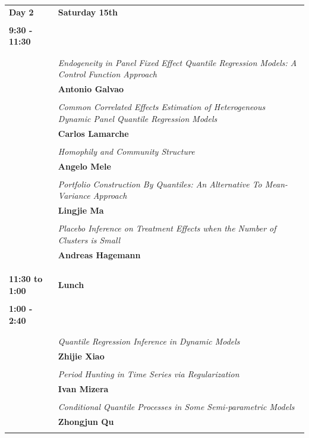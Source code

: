 \documentclass[11pt]{amsart}
\begin{document}
\begin{tabularx}{\linewidth}{l X}
\\
\large{\bf{Day 2}} & \large{\bf{Saturday 15th}} \\
\\


\bf{9:30 - 11:30} & \large{\color{blue}{\bf{Session 3}}}  \\
\hline
\\
\\
& \it{Endogeneity in Panel Fixed Effect Quantile Regression Models: A Control Function Approach} \\
& \small{\textbf{Antonio Galvao}} \\
\\
& \it{Common Correlated Effects Estimation of Heterogeneous Dynamic Panel Quantile Regression Models} \\
& \small{\textbf{Carlos Lamarche}} \\
\\
& \it{Homophily and Community Structure}\\
& \small{\textbf{Angelo Mele}} \\
\\
& \it{Portfolio Construction By Quantiles: An Alternative To Mean-Variance Approach} \\
& \small{\textbf{Lingjie Ma}} \\
\\
& \it{Placebo Inference on Treatment Effects when the Number of Clusters is Small} \\
& \small{\textbf{Andreas Hagemann}} \\
\\
\\
\\
\bf{11:30 to 1:00 } & \large{\bf{Lunch}} \\
\\

\bf{1:00 - 2:40} & \large{\color{blue}{\bf{Session 4}}}  \\
\hline
\\
\\
& \it{Quantile Regression Inference in Dynamic Models} \\
& \small{\textbf{Zhijie Xiao}} \\
\\
& \it{Period Hunting in Time Series via Regularization}\\
& \small{\textbf{Ivan Mizera}} \\
\\
& \it{Conditional Quantile Processes in Some Semi-parametric Models} \\
& \small{\textbf{Zhongjun Qu}} \\
\\


\end{tabularx}
\end{document}
